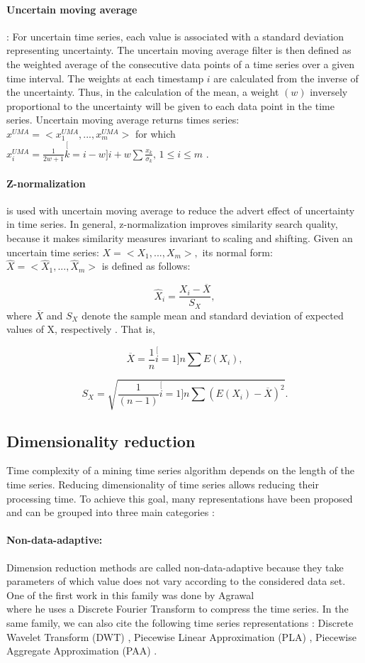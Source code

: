 \paragraph{Uncertain moving average} :  For uncertain time series, each value is associated with a standard deviation representing uncertainty. The uncertain moving average filter is then defined as the weighted average of the consecutive data points of a time series over a given time interval. The weights at each timestamp $i$ are calculated from the inverse of the uncertainty. Thus, in the calculation of the mean, a weight $(w)$ inversely proportional to the uncertainty will be given to each data point in the time series. Uncertain moving average returns times series: $x^{UMA}=<x_{1}^{UMA},...,x_{m}^{UMA}>$ for which $x_{i}^{UMA}=\frac{1}{2w+1}\stackrel[k=i-w]{i+w}{\sum}\frac{x_{k}}{\sigma_{k}},\,1\leq i\leq m$ \cite{Orang2015}.

\paragraph{Z-normalization} is used with uncertain moving average to reduce the advert effect of uncertainty in time series. In general, z-normalization improves similarity search quality, because it makes similarity measures invariant to scaling and shifting. Given an uncertain time series: $X=<X_{1},...,X_{m}>,$ its normal form: $\hat{X}=<\hat{X}_{1},...,\hat{X}_{m}>$ is defined as follows: 

\[
\ensuremath{\hat{X}_{i}}=\frac{X_{i}-\overline{X}}{S_{X}},
\]
where $\overline{X}$ and $S_{X}$ denote the sample mean and standard deviation of expected values of X, respectively \cite{Orang2015}. That is,

\[
\overline{X}=\frac{1}{n}\stackrel[i=1]{n}{\sum}E(X_{i}),
\]

\[
S_{X}=\sqrt{\frac{1}{(n-1)}\stackrel[i=1]{n}{\sum}(E(X_{i})-\overline{X})^{2}}.
\]

\subsection{Dimensionality reduction}
Time complexity of a mining time series algorithm depends on the length of the time series. Reducing dimensionality of time series allows reducing their processing time. To achieve this goal, many representations have been proposed and can be grouped into three main categories : 

\paragraph{Non-data-adaptive:}Dimension reduction methods are called non-data-adaptive because they take parameters of which value does not vary according to the considered data set. One of the first work in this family was done by Agrawal \\ \cite{Agrawal1993} where he uses a Discrete Fourier Transform to compress the time series. In the same family, we can also cite the following time series representations :  Discrete Wavelet Transform (DWT) \cite{chan1999efficient}, Piecewise Linear Approximation (PLA) \cite{eriksson2004piecewise}, Piecewise Aggregate Approximation (PAA) \cite{Keogh2001a}. 

